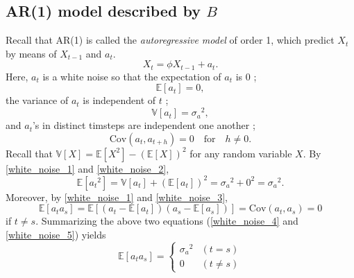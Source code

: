 \documentclass{article}
\newcommand\ar{\ensuremath{\text{AR}}}
\newcommand\cov{\ensuremath{\text{Cov}}}
\newcommand\sa{\ensuremath{{\sigma_a}^2}}
\begin{document}
%
\subsection{AR(1) model described by \(B\)}
Recall that \ar(1) is called the \emph{autoregressive model} of order 1, which predict \(X_t\) by means of \(X_{t-1}\) and \(a_t\).
\begin{equation}\label{ar1}
X_t=\phi X_{t-1}+a_t.
\end{equation}
Here, \(a_t\) is a white noise so that the expectation of \(a_t\) is 0 ;
\begin{equation}\label{white_noise_1}
\mathbb E[a_t]=0,
\end{equation}
the variance of \(a_t\) is independent of \(t\) ;
\begin{equation}\label{white_noise_2}
\mathbb V[a_t]=\sa,
\end{equation}
and \(a_t\)'s in distinct timsteps are independent one another ;
\begin{equation}\label{white_noise_3}
\cov(a_t,a_{t+h})=0\quad\text{for}\quad h\neq0.
\end{equation}
Recall that \(\mathbb V[X]=\mathbb E[X^2]-(\mathbb E[X])^2\) for any random variable \(X\).
By \eqref{white_noise_1} and \eqref{white_noise_2},
\begin{equation}\label{white_noise_4}
\mathbb E[{a_t}^2]=\mathbb V[a_t]+(\mathbb E[a_t])^2=\sa+0^2=\sa.
\end{equation}
Moreover, by \eqref{white_noise_1} and \eqref{white_noise_3},
\begin{equation}\label{white_noise_5}
\mathbb E[a_ta_s]=\mathbb E[(a_t-\mathbb E[a_t])(a_s-\mathbb E[a_s])]=\cov(a_t,a_s)=0
\end{equation}
if \(t\neq s\).
Summarizing the above two equations (\eqref{white_noise_4} and \eqref{white_noise_5}) yields
\begin{equation}\label{white_noise_6}
\mathbb E[a_ta_s]=
\begin{cases}
\sa&(t=s)\\
0&(t\ne s)
\end{cases}
\end{equation}
\end{document}
